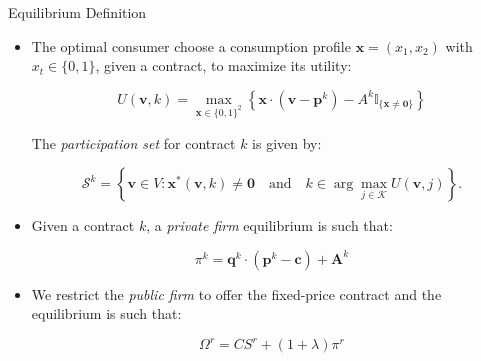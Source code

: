 \documentclass{class}
\begin{document}



\begin{frame}{Equilibrium Definition}


\begin{itemize}

\item The optimal consumer choose a consumption profile $\textbf{x} = (x_1,x_2)$ with $x_t \in\{0,1\}$, given a contract, to maximize its utility:

\vfill

\begin{equation*}
    U(\mathbf{v}, k) = \max_{\mathbf{x} \in \{0,1\}^2} \left\{ \mathbf{x} \cdot (\mathbf{v} - \mathbf{p}^k) - A^k \mathbb{I}_{\{\mathbf{x} \neq \mathbf{0}\}} \right\}
\end{equation*}

\vfill
The \textit{participation set} for contract $k$ is given by:

\begin{equation*} \label{eq:active_set_general}
    \mathcal{S}^k = \left\{ \mathbf{v} \in V : \mathbf{x}^*(\mathbf{v},k) \neq \mathbf{0} \quad \text{and} \quad k \in \arg\max_{j \in \mathcal{K}} U(\mathbf{v}, j) \right\}.
\end{equation*}

\vfill
    
\item Given a contract $k$, a \textit{private firm} equilibrium is such that:

\vfill

    \begin{equation*}
        \pi^k = \mathbf{q}^k \cdot (\mathbf{p}^k - \mathbf{c}) + \mathbf{A}^k
        \label{eq:private_obj}
    \end{equation*}

\vfill

\item We restrict the \textit{public firm} to offer the fixed-price contract and the equilibrium is such that:

\vfill

    \begin{equation} \label{eq:public_obj}
        \Omega^r = CS^r + (1+\lambda)\pi^r
    \end{equation}

\end{itemize}
    
\end{frame}
\end{document}
